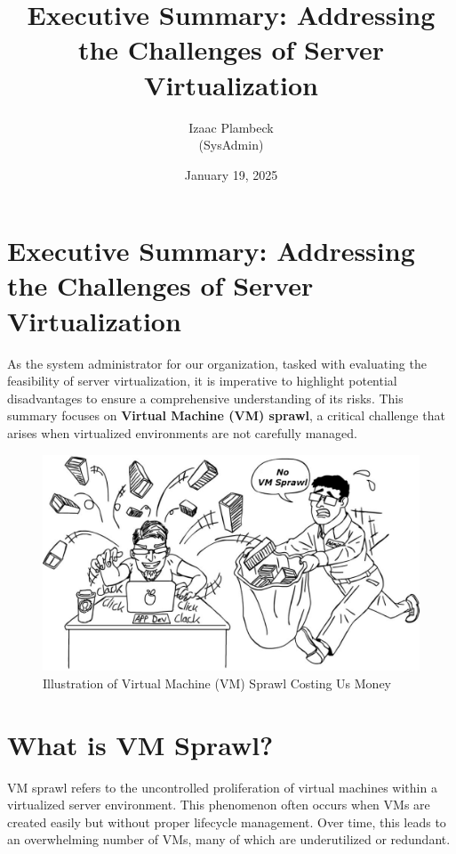 \documentclass[11pt,a4paper,twocolumn]{article}
\title{\ttfamily Executive Summary: Addressing the Challenges of Server Virtualization} %
\author{\sffamily Izaac Plambeck \\ (SysAdmin)} %
\date{\sffamily January 19, 2025} %
\begin{document}
\twocolumn[
\begin{@twocolumnfalse}
\maketitle
\end{@twocolumnfalse}
]

\section{Executive Summary: Addressing the Challenges of Server Virtualization}
As the system administrator for our organization, tasked with evaluating the feasibility of server virtualization, it is imperative to highlight potential disadvantages to ensure a comprehensive understanding of its risks. This summary focuses on \textbf{Virtual Machine (VM) sprawl}, a critical challenge that arises when virtualized environments are not carefully managed.

\begin{figure}[H] %
    \centering
    \includegraphics[width=0.8\linewidth]{novmsprawl.png}
    \caption{\sffamily Illustration of Virtual Machine (VM) Sprawl Costing Us Money} %

\end{figure}

\section{What is VM Sprawl?}
VM sprawl refers to the uncontrolled proliferation of virtual machines within a virtualized server environment. This phenomenon often occurs when VMs are created easily but without proper lifecycle management. Over time, this leads to an overwhelming number of VMs, many of which are underutilized or redundant.
\end{document}
